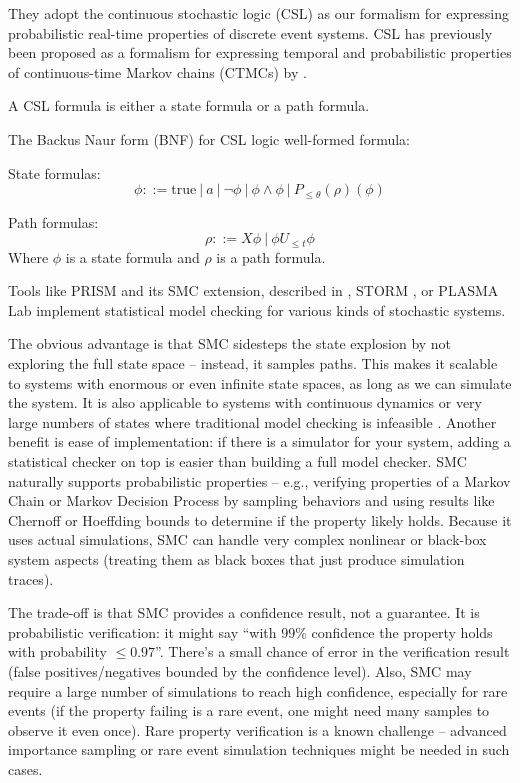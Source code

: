 They adopt the continuous stochastic logic (CSL) as our formalism for expressing 
probabilistic real-time properties of discrete event systems. CSL has previously 
been proposed as a formalism for expressing temporal and probabilistic
properties of continuous-time Markov chains (CTMCs) by \citeauthor{Aziz1996VerifyingCTMC} 
\cite{Aziz1996VerifyingCTMC}.

A CSL formula is either a state formula or a path formula.

The Backus Naur form (BNF) for CSL logic well-formed formula:

State formulas:
\[
    \phi ::= \text{true}\ |\ a\ |\ \neg \phi\ |\ \phi \land \phi\ |\ P_{\leq \theta} (\rho)(\phi)
\]

Path formulas:
\[
    \rho::= X \phi\ |\ \phi U_{\leq t} \phi
\]
Where $\phi$ is a state formula and  $\rho$ is a path formula.

Tools like PRISM and its SMC extension, described in \cite{Kwiatkowska2011PRISM}, 
STORM \cite{Dehnert2017Storm}, or PLASMA Lab \cite{Legay2016PlasmaLab} implement 
statistical model checking for various kinds of stochastic systems.

The obvious advantage is that SMC sidesteps the state explosion by not exploring the full
state space – instead, it samples paths. 
This makes it scalable to systems with enormous or even infinite state
spaces, as long as we can simulate the system. It is also applicable to systems 
with continuous dynamics or very large numbers of states where traditional model 
checking is infeasible . Another benefit is ease of implementation: if there 
is a simulator for your system, adding a statistical checker on top is easier 
than building a full model checker. SMC naturally supports probabilistic properties 
– e.g., verifying properties of a Markov Chain or Markov Decision Process by 
sampling behaviors and using results like Chernoff or Hoeffding bounds to determine 
if the property likely holds. Because it uses actual simulations, SMC can
handle very complex nonlinear or black-box system aspects (treating them as 
black boxes that just produce simulation traces).

The trade-off is that SMC provides a confidence result, not a guarantee. It is probabilistic
verification: it might say “with 99\% confidence the property holds with probability $\leq 0.97$”. There’s a small
chance of error in the verification result (false positives/negatives bounded by the confidence level). Also,
SMC may require a large number of simulations to reach high confidence, especially for rare events (if the
property failing is a rare event, one might need many samples to observe it even once). Rare property
verification is a known challenge – advanced importance sampling or rare event simulation techniques
might be needed in such cases. 

